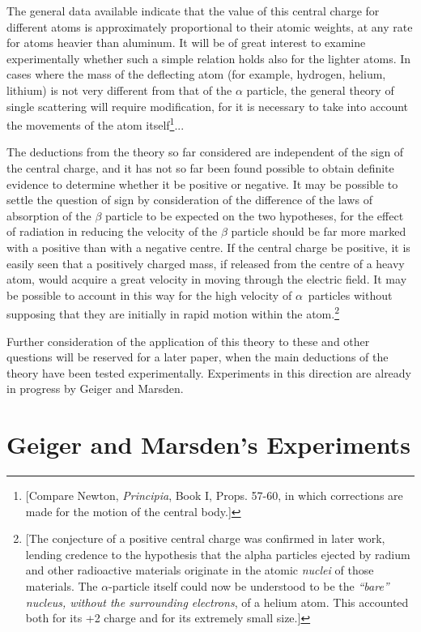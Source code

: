 The general data available indicate that the value of this central
charge for different atoms is approximately proportional to their atomic
weights, at any rate for atoms heavier than aluminum. It will be of
great interest to examine experimentally whether such a simple relation
holds also for the lighter atoms. In cases where the mass of the
deflecting atom (for example, hydrogen, helium, lithium) is not very
different from that of the $\alpha$ particle, the general theory of
single scattering will require modification, for it is necessary to take
into account the movements of the atom itself\footnote{{[}Compare
  Newton, \emph{Principia}, Book I, Props. 57-60, in which corrections
  are made for the motion of the central body.{]}}...

The deductions from the theory so far considered are independent of the
sign of the central charge, and it has not so far been found possible to
obtain definite evidence to determine whether it be positive or
negative. It may be possible to settle the question of sign by
consideration of the difference of the laws of absorption of the
$\beta$ particle to be expected on the two hypotheses, for the effect
of radiation in reducing the velocity of the $\beta$ particle should be
far more marked with a positive than with a negative centre. If the
central charge be positive, it is easily seen that a positively charged
mass, if released from the centre of a heavy atom, would acquire a great
velocity in moving through the electric field. It may be possible to
account in this way for the high velocity of $\alpha$~particles without
supposing that they are initially in rapid motion within the
atom.\footnote{{[}The conjecture of a positive central charge was
  confirmed in later work, lending credence to the hypothesis that the
  alpha particles ejected by radium and other radioactive materials
  originate in the atomic \emph{nuclei} of those materials. The
  $\alpha$-particle itself could now be understood to be the
  \emph{``bare'' nucleus, without the surrounding electrons}, of a
  helium atom. This accounted both for its +2 charge and for its
  extremely small size.{]}}

Further consideration of the application of this theory to these and
other questions will be reserved for a later paper, when the main
deductions of the theory have been tested experimentally. Experiments in
this direction are already in progress by Geiger and Marsden.

\section*{Geiger and Marsden's Experiments}


